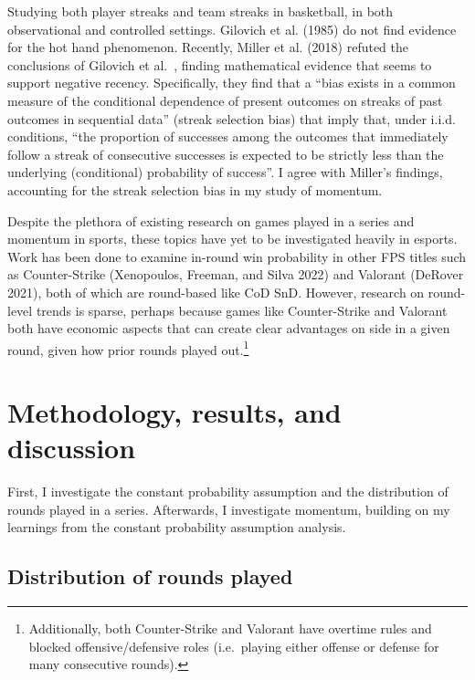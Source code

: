 \documentclass{article}
\begin{document}
Studying both player streaks and team streaks in basketball, in both
observational and controlled settings. Gilovich et al. (1985) do not
find evidence for the hot hand phenomenon. Recently, Miller et al.
(2018) refuted the conclusions of Gilovich et al.~, finding mathematical
evidence that seems to support negative recency. Specifically, they find
that a ``bias exists in a common measure of the conditional dependence
of present outcomes on streaks of past outcomes in sequential data''
(streak selection bias) that imply that, under i.i.d. conditions, ``the
proportion of successes among the outcomes that immediately follow a
streak of consecutive successes is expected to be strictly less than the
underlying (conditional) probability of success''. I agree with Miller's
findings, accounting for the streak selection bias in my study of
momentum.

Despite the plethora of existing research on games played in a series
and momentum in sports, these topics have yet to be investigated heavily
in esports. Work has been done to examine in-round win probability in
other FPS titles such as Counter-Strike (Xenopoulos, Freeman, and Silva
2022) and Valorant (DeRover 2021), both of which are round-based like
CoD SnD. However, research on round-level trends is sparse, perhaps
because games like Counter-Strike and Valorant both have economic
aspects that can create clear advantages on side in a given round, given
how prior rounds played out.\footnote{Additionally, both Counter-Strike
  and Valorant have overtime rules and blocked offensive/defensive roles
  (i.e.~playing either offense or defense for many consecutive rounds).}

\hypertarget{methodology-results-and-discussion}{%
\section{Methodology, results, and
discussion}\label{methodology-results-and-discussion}}

First, I investigate the constant probability assumption and the
distribution of rounds played in a series. Afterwards, I investigate
momentum, building on my learnings from the constant probability
assumption analysis.

\hypertarget{distribution-of-rounds-played}{%
\subsection{Distribution of rounds
played}\label{distribution-of-rounds-played}}
\end{document}
